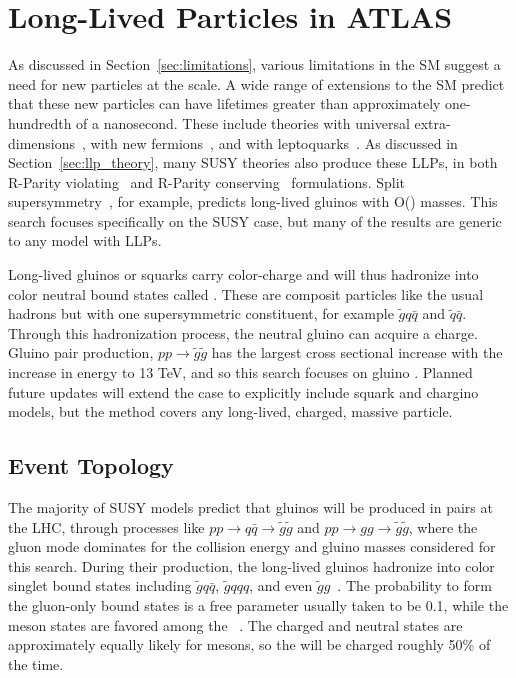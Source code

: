 \chapter{Long-Lived Particles in ATLAS}

\label{ch:simulation}

As discussed in Section~\ref{sec:limitations}, various limitations in the \ac{SM} suggest a need for new particles at the \TeV scale. 
A wide range of extensions to the \acl{SM} predict that these new particles can have lifetimes greater than approximately one-hundredth of a nanosecond.
These include theories with universal extra-dimensions~\cite{extra_dim1, extra_dim2}, with new fermions~\cite{newfermions}, and with leptoquarks~\cite{leptoquark}.
As discussed in Section~\ref{sec:llp_theory}, many \ac{SUSY} theories also produce these \acp{LLP}, in both R-Parity violating~\cite{rpv1, rpv2, rpv3} and R-Parity conserving~\cite{rpc1, rpc2, rpc3, rpc4} formulations.
Split supersymmetry~\cite{split1, split2}, for example, predicts long-lived gluinos with O(\TeV) masses.
This search focuses specifically on the \ac{SUSY} case, but many of the results are generic to any model with \acp{LLP}. 

Long-lived gluinos or squarks carry color-charge and will thus hadronize into color neutral bound states called \rhadrons.
These are composit particles like the usual hadrons but with one supersymmetric constituent, for example $\tilde{g}q\bar{q}$ and $\tilde{q}\bar{q}$.
Through this hadronization process, the neutral gluino can acquire a charge.
Gluino pair production, $p p\rightarrow \tilde{g}\tilde{g}$ has the largest cross sectional increase with the increase in energy to 13 TeV, and so this search focuses on gluino \rhadrons.
Planned future updates will extend the case to explicitly include squark and chargino models, but the method covers any long-lived, charged, massive particle.

\section{Event Topology}
\label{sec:characteristics}

The majority of SUSY models predict that gluinos will be produced in pairs at the \ac{LHC}, through processes like $p p \rightarrow q\bar{q} \rightarrow \tilde{g}\tilde{g}$ and $p p \rightarrow g g \rightarrow \tilde{g}\tilde{g}$, where the gluon mode dominates for the collision energy and gluino masses considered for this search.
During their production, the long-lived gluinos hadronize into color singlet bound states including $\tilde{g}q\bar{q}$, $\tilde{g}qqq$, and even $\tilde{g}g$~\cite{rhadron}.
The probability to form the gluon-only bound states is a free parameter usually taken to be 0.1, while the meson states are favored among the \rhadrons~\cite{rhad_atlas}.
The charged and neutral states are approximately equally likely for mesons, so the \rhadrons will be charged roughly 50\% of the time.

